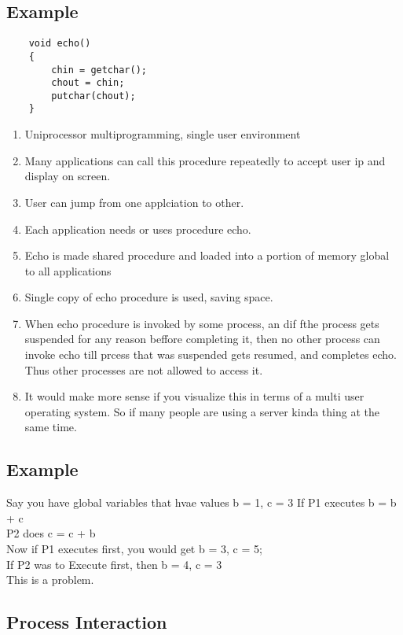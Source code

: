 \documentclass[11pt]{article}
\begin{document}
\subsection{Example}

\begin{verbatim}
    void echo()
    {
        chin = getchar();
        chout = chin;
        putchar(chout);
    }
\end{verbatim}

\begin{enumerate}
	\item Uniprocessor multiprogramming, single user environment
	\item Many applications can call this procedure repeatedly to accept user ip and display on screen.
	\item User can jump from one applciation to other.
	\item Each application needs or uses procedure echo.
	\item Echo is made shared procedure and loaded into a portion of memory global to all applications
	\item Single copy of echo procedure is used, saving space.
	\item When echo procedure is invoked by some process, an dif fthe process gets suspended for any reason beffore completing it, then no other process can invoke echo till prcess that was suspended gets resumed, and completes echo. Thus other processes are not allowed to access it.
	\item It would make more sense if you visualize this in terms of a multi user operating system. So if many people are using a server kinda thing at the same time.
\end{enumerate}

\subsection{Example}
Say you have global variables that hvae values b = 1, c = 3
If P1 executes b = b + c \\
P2 does c = c + b\\

Now if P1 executes first, you would get b = 3, c = 5;\\
If P2 was to Execute first, then b = 4, c = 3\\

This is a problem.


\subsection{Process Interaction}
\end{document}

